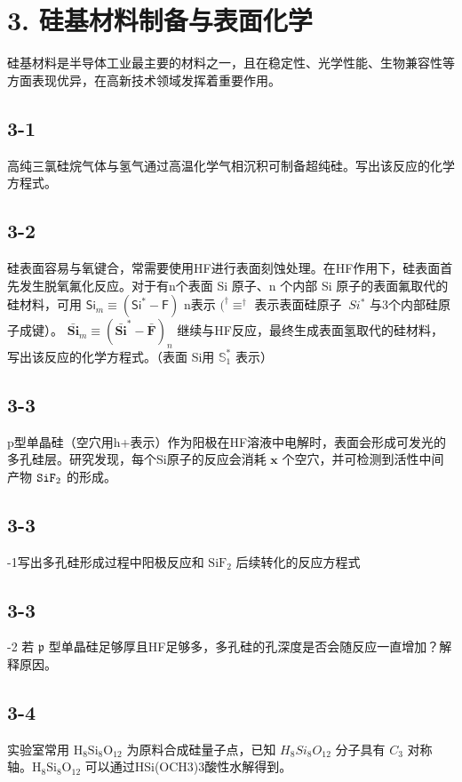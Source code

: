 \section*{3. 硅基材料制备与表面化学}
硅基材料是半导体工业最主要的材料之一，且在稳定性、光学性能、生物兼容性等方面表现优异，在高新技术领域发挥着重要作用。

\subsection*{3-1}
高纯三氯硅烷气体与氢气通过高温化学气相沉积可制备超纯硅。写出该反应的化学方程式。

\subsection*{3-2}
硅表面容易与氧键合，常需要使用HF进行表面刻蚀处理。在HF作用下，硅表面首先发生脱氧氟化反应。对于有n个表面 Si 原子、n 个内部 Si 原子的表面氟取代的硅材料，可用 $\mathsf { S i } _ { m } { \equiv } ( \mathsf { S i } ^ { * } { - } \mathsf { F } )$ n表示 $( ^ { \dag } \equiv ^ { \dag }$ 表示表面硅原子 ${ \ S i ^ { * } }$ 与3个内部硅原子成键）。 ${ \bar { \mathbf { S i } } } _ { m } { \equiv } ( { \bar { \mathbf { S i } } } ^ { * } { - } { \bar { \mathbf { F } } } ) _ { n }$ 继续与HF反应，最终生成表面氢取代的硅材料，写出该反应的化学方程式。（表面 Si用 ${ \mathbb S } _ { 1 } ^ { * }$ 表示）

\subsection*{3-3}
p型单晶硅（空穴用h+表示）作为阳极在HF溶液中电解时，表面会形成可发光的多孔硅层。研究发现，每个Si原子的反应会消耗 $\pmb { x }$ 个空穴，并可检测到活性中间产物 ${ \tt S i F } _ { 2 }$ 的形成。

\subsection*{3-3}
-1写出多孔硅形成过程中阳极反应和 $\mathrm { S i F } _ { 2 }$ 后续转化的反应方程式

\subsection*{3-3}
-2 若 $\mathfrak { p }$ 型单晶硅足够厚且HF足够多，多孔硅的孔深度是否会随反应一直增加？解释原因。

\subsection*{3-4}
实验室常用 $\mathrm { H } _ { 8 } \mathrm { S i } _ { 8 } \mathrm { O } _ { 1 2 }$ 为原料合成硅量子点，已知 $H _ { 8 } S i _ { 8 } O _ { 1 2 }$ 分子具有 $C _ { 3 }$ 对称轴。$\mathrm { H } _ { 8 } \mathrm { S i } _ { 8 } \mathrm { O } _ { 1 2 }$ 可以通过HSi(OCH3)3酸性水解得到。

